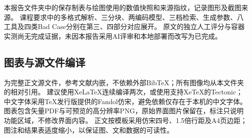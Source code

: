 \documentclass[UTF8,a4paper,zihao=-4,fontset=fandol]{ctexart}
\begin{document}
本报告文件夹中的保存制表与绘图使用的数值快照和来源指纹，记录图形及截图来源。
课程要求中的多格式解析、三分块、两编码模型、三档检索、生成参数、八工具及四类Bad Case分别在第三、四部分对应展开。
原文的独立人工评分与容器实测尚无完成证据，未因本报告采用AI评审和本地部署而改写为已完成。

\subsection{图表与源文件编译}
为完整正文源文件，参考文献内嵌，不依赖外部BibTeX；所有图像均从本文件夹的相对引用。
建议使用XeLaTeX连续编译两次，或使用支持XeTeX的Tectonic；中文字体采用TeX发行版提供的Fandol仿宋，避免依赖仅存在于本机的中文字体。
图表包含矢量PDF与可预览的高分辨率PNG，原始界面图片保留在，标注只说明功能区域，不修改界面内容。
正文按模板采用仿宋四号、1.5倍行距及A4页边距；图注和结果表适度缩小，以保证图、文和数据的可读性。
\end{document}

